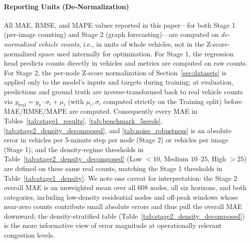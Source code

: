 \documentclass[journal,twocolumn]{IEEEtran}
\begin{document}
\paragraph{Reporting Units (De-Normalization)}
All MAE, RMSE, and MAPE values reported in this paper---for both Stage 1 (per-image counting) and Stage 2 (graph forecasting)---are computed on \emph{de-normalized vehicle counts}, i.e., in units of whole vehicles, not in the Z-score-normalized space used internally for optimization. For Stage 1, the regression head predicts counts directly in vehicles and metrics are computed on raw counts. For Stage 2, the per-node Z-score normalization of Section~\ref{sec:datasets} is applied only to the model's inputs and targets during training; at evaluation, predictions and ground truth are inverse-transformed back to real vehicle counts via $y_{\text{real}} = y_{\text{z}} \cdot \sigma_i + \mu_i$ (with $\mu_i, \sigma_i$ computed strictly on the Training split) before MAE/RMSE/MAPE are computed. Consequently every MAE in Tables~\ref{tab:stage1_results}, \ref{tab:benchmark_5seeds}, \ref{tab:stage2_density_decomposed}, and \ref{tab:noise_robustness} is an absolute error in vehicles per 5-minute step per node (Stage 2) or vehicles per image (Stage 1), and the density-regime thresholds in Table~\ref{tab:stage2_density_decomposed} (Low $<10$, Medium $10$--$25$, High $>25$) are defined on these same real counts, matching the Stage 1 thresholds in Table~\ref{tab:stage1_density}. We note one caveat for interpretation: the Stage 2 overall MAE is an unweighted mean over all $608$ nodes, all six horizons, and both categories, including low-density residential nodes and off-peak windows whose near-zero counts contribute small absolute errors and thus pull the overall MAE downward; the density-stratified table (Table~\ref{tab:stage2_density_decomposed}) is the more informative view of error magnitude at operationally relevant congestion levels.

\end{document}
